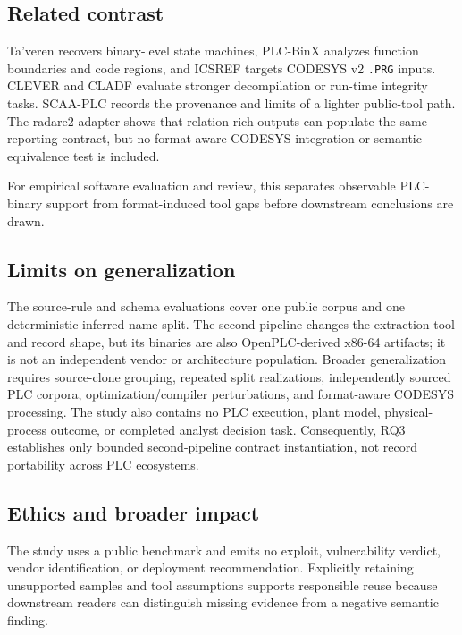 \documentclass[manuscript,screen,review]{acmart}
\begin{document}
\subsection{Related contrast}

Ta'veren recovers binary-level state machines, PLC-BinX analyzes function boundaries and code regions, and ICSREF targets CODESYS v2 \texttt{.PRG} inputs. CLEVER and CLADF evaluate stronger decompilation or run-time integrity tasks. SCAA-PLC records the provenance and limits of a lighter public-tool path. The radare2 adapter shows that relation-rich outputs can populate the same reporting contract, but no format-aware CODESYS integration or semantic-equivalence test is included.

For empirical software evaluation and review, this separates observable PLC-binary support from format-induced tool gaps before downstream conclusions are drawn.

\subsection{Limits on generalization}

The source-rule and schema evaluations cover one public corpus and one deterministic inferred-name split. The second pipeline changes the extraction tool and record shape, but its binaries are also OpenPLC-derived x86-64 artifacts; it is not an independent vendor or architecture population. Broader generalization requires source-clone grouping, repeated split realizations, independently sourced PLC corpora, optimization/compiler perturbations, and format-aware CODESYS processing. The study also contains no PLC execution, plant model, physical-process outcome, or completed analyst decision task. Consequently, RQ3 establishes only bounded second-pipeline contract instantiation, not record portability across PLC ecosystems.

\subsection{Ethics and broader impact}

The study uses a public benchmark and emits no exploit, vulnerability verdict, vendor identification, or deployment recommendation. Explicitly retaining unsupported samples and tool assumptions supports responsible reuse because downstream readers can distinguish missing evidence from a negative semantic finding.


\end{document}
